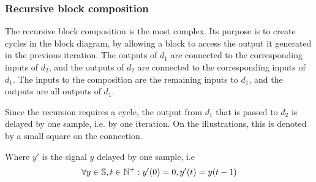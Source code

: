 \subsubsection{Recursive block composition}
The recursive block composition is the most complex. Its purpose is to create cycles in the block diagram, by
allowing a block to access the output it generated in the previous iteration. The outputs of
$d_1$ are connected to the corresponding inputs of $d_2$, and the outputs
of $d_2$ are connected to the corresponding inputs of $d_1$. The inputs to
the composition are the remaining inputs to $d_1$, and the outputs are all outputs of
$d_1$.

Since the recursion requires a cycle, the output from $d_1$ that is passed to
$d_2$ is delayed by one sample, i.e. by one iteration. On the illustrations, this is denoted
by a small square on the connection.

\begin{minipage}{0.5\linewidth}
  \begin{prooftree}
  \end{prooftree}
  \begin{prooftree}
  \end{prooftree}
  \vspace{\baselineskip}
  Where $y'$ is the signal $y$ delayed by one sample, i.e
  $$
    \forall y \in \Sig, t \in \mathbb{N}^+ : y'(0) = 0, y'(t) = y(t - 1)
  $$
\end{minipage}
\begin{minipage}{0.5\linewidth}
  \begin{figure}[H]
    \centering
    \label{fig:block_rec}
    
  \end{figure}
\end{minipage}

